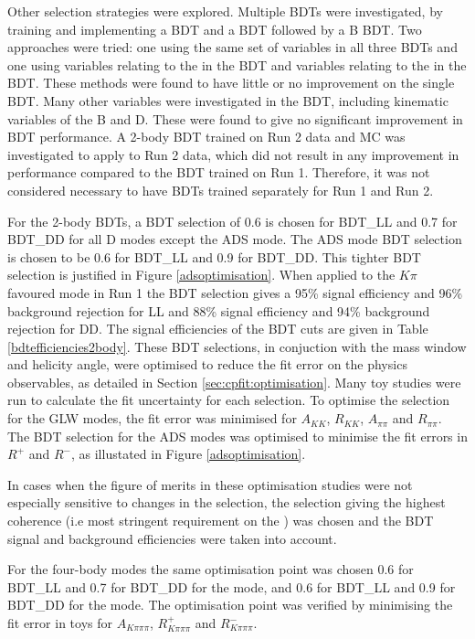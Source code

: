 Other selection strategies were explored. Multiple BDTs were investigated, by training and implementing a \KS BDT and a \Dz BDT followed by a B BDT. Two approaches were tried: one using the same set of variables in all three BDTs and one using variables relating to the \KS in the \KS BDT and variables relating to the \Dz in the \Dz BDT. These methods were found to have little or no improvement on the single BDT. Many other variables were investigated in the BDT, including kinematic variables of the B and D. These were found to give no significant improvement in BDT performance. A 2-body BDT trained on Run 2 data and MC was investigated to apply to Run 2 data, which did not result in any improvement in performance compared to the BDT trained on Run 1. Therefore, it was not considered necessary to have BDTs trained separately for Run 1 and Run 2.

For the 2-body BDTs, a BDT selection of 0.6 is chosen for BDT\_LL and 0.7 for BDT\_DD for all D modes except the ADS mode. The ADS mode BDT selection is chosen to be 0.6 for BDT\_LL and 0.9 for BDT\_DD. This tighter BDT selection is justified in Figure \ref{adsoptimisation}. When applied to the $K\pi$ favoured mode in Run 1 the BDT selection gives a 95\% signal efficiency and 96\% background rejection for LL and 88\% signal efficiency and 94\% background rejection for DD. The signal efficiencies of the BDT cuts are given in Table \ref{bdtefficiencies2body}. These BDT selections, in conjuction with the \Kstarm mass window and \KS helicity angle, were optimised to reduce the fit error on the physics observables, as detailed in Section \ref{sec:cpfit:optimisation}. Many toy studies were run to calculate the fit uncertainty for each selection. To optimise the selection for the GLW modes, the fit error was minimised for $A_{KK}$, $R_{KK}$, $A_{\pi\pi}$ and $R_{\pi\pi}$. The BDT selection for the ADS modes was optimised to minimise the fit errors in $R^+$ and $R^-$, as illustated in Figure \ref{adsoptimisation}. 

In cases when the figure of merits in these optimisation studies were not especially sensitive to changes in the selection, the selection giving the highest coherence (i.e most stringent requirement on the \Kstarm) was chosen and the BDT signal and background efficiencies were taken into account.

For the four-body modes the same optimisation point was chosen 0.6 for BDT\_LL and 0.7 for BDT\_DD for the \decay{\Dz}{\Kp\pim\pip\pim} \decay{\Dz}{\pi\pi\pi\pi} mode, and 0.6 for BDT\_LL and 0.9 for BDT\_DD for the \decay{\Dz}{\Kp\pim\pip\pim} mode. The optimisation point was verified by minimising the fit error in toys for $A_{K\pi\pi\pi}$, $R^+_{K\pi\pi\pi}$ and $R^-_{K\pi\pi\pi}$.


